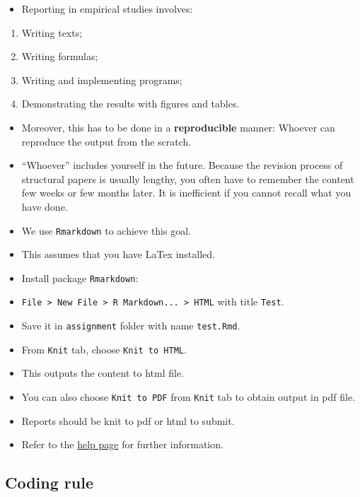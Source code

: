 \documentclass[
]{book}
\providecommand{\tightlist}{%
  \setlength{\itemsep}{0pt}\setlength{\parskip}{0pt}}
\begin{document}
\begin{itemize}
\tightlist
\item
  Reporting in empirical studies involves:
\end{itemize}

\begin{enumerate}
\def\labelenumi{\arabic{enumi}.}
\tightlist
\item
  Writing texts;
\item
  Writing formulas;
\item
  Writing and implementing programs;
\item
  Demonstrating the results with figures and tables.
\end{enumerate}

\begin{itemize}
\item
  Moreover, this has to be done in a \textbf{reproducible} manner: Whoever can reproduce the output from the scratch.
\item
  ``Whoever'' includes yourself in the future. Because the revision process of structural papers is usually lengthy, you often have to remember the content few weeks or few months later. It is inefficient if you cannot recall what you have done.
\item
  We use \texttt{Rmarkdown} to achieve this goal.
\item
  This assumes that you have LaTex installed.
\item
  Install package \texttt{Rmarkdown}:
\item
  \texttt{File\ \textgreater{}\ New\ File\ \textgreater{}\ R\ Markdown...\ \textgreater{}\ HTML} with title \texttt{Test}.
\item
  Save it in \texttt{assignment} folder with name \texttt{test.Rmd}.
\item
  From \texttt{Knit} tab, choose \texttt{Knit\ to\ HTML}.
\item
  This outputs the content to html file.
\item
  You can also choose \texttt{Knit\ to\ PDF} from \texttt{Knit} tab to obtain output in pdf file.
\item
  Reports should be knit to pdf or html to submit.
\item
  Refer to the \href{https://rmarkdown.rstudio.com/lesson-1.html}{help page} for further information.
\end{itemize}

\hypertarget{coding-rule}{%
\subsection{Coding rule}\label{coding-rule}}
\end{document}

